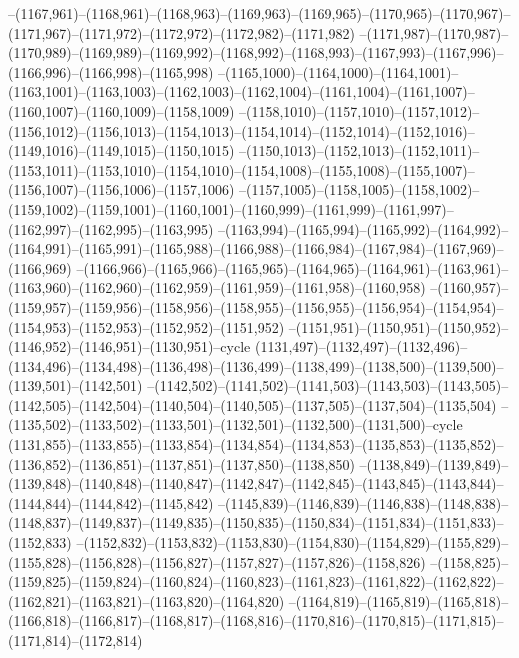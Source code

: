 --(1167,961)--(1168,961)--(1168,963)--(1169,963)--(1169,965)--(1170,965)--(1170,967)--(1171,967)--(1171,972)--(1172,972)--(1172,982)--(1171,982)
--(1171,987)--(1170,987)--(1170,989)--(1169,989)--(1169,992)--(1168,992)--(1168,993)--(1167,993)--(1167,996)--(1166,996)--(1166,998)--(1165,998)
--(1165,1000)--(1164,1000)--(1164,1001)--(1163,1001)--(1163,1003)--(1162,1003)--(1162,1004)--(1161,1004)--(1161,1007)--(1160,1007)--(1160,1009)--(1158,1009)
--(1158,1010)--(1157,1010)--(1157,1012)--(1156,1012)--(1156,1013)--(1154,1013)--(1154,1014)--(1152,1014)--(1152,1016)--(1149,1016)--(1149,1015)--(1150,1015)
--(1150,1013)--(1152,1013)--(1152,1011)--(1153,1011)--(1153,1010)--(1154,1010)--(1154,1008)--(1155,1008)--(1155,1007)--(1156,1007)--(1156,1006)--(1157,1006)
--(1157,1005)--(1158,1005)--(1158,1002)--(1159,1002)--(1159,1001)--(1160,1001)--(1160,999)--(1161,999)--(1161,997)--(1162,997)--(1162,995)--(1163,995)
--(1163,994)--(1165,994)--(1165,992)--(1164,992)--(1164,991)--(1165,991)--(1165,988)--(1166,988)--(1166,984)--(1167,984)--(1167,969)--(1166,969)
--(1166,966)--(1165,966)--(1165,965)--(1164,965)--(1164,961)--(1163,961)--(1163,960)--(1162,960)--(1162,959)--(1161,959)--(1161,958)--(1160,958)
--(1160,957)--(1159,957)--(1159,956)--(1158,956)--(1158,955)--(1156,955)--(1156,954)--(1154,954)--(1154,953)--(1152,953)--(1152,952)--(1151,952)
--(1151,951)--(1150,951)--(1150,952)--(1146,952)--(1146,951)--(1130,951)--cycle
(1131,497)--(1132,497)--(1132,496)--(1134,496)--(1134,498)--(1136,498)--(1136,499)--(1138,499)--(1138,500)--(1139,500)--(1139,501)--(1142,501)
--(1142,502)--(1141,502)--(1141,503)--(1143,503)--(1143,505)--(1142,505)--(1142,504)--(1140,504)--(1140,505)--(1137,505)--(1137,504)--(1135,504)
--(1135,502)--(1133,502)--(1133,501)--(1132,501)--(1132,500)--(1131,500)--cycle
(1131,855)--(1133,855)--(1133,854)--(1134,854)--(1134,853)--(1135,853)--(1135,852)--(1136,852)--(1136,851)--(1137,851)--(1137,850)--(1138,850)
--(1138,849)--(1139,849)--(1139,848)--(1140,848)--(1140,847)--(1142,847)--(1142,845)--(1143,845)--(1143,844)--(1144,844)--(1144,842)--(1145,842)
--(1145,839)--(1146,839)--(1146,838)--(1148,838)--(1148,837)--(1149,837)--(1149,835)--(1150,835)--(1150,834)--(1151,834)--(1151,833)--(1152,833)
--(1152,832)--(1153,832)--(1153,830)--(1154,830)--(1154,829)--(1155,829)--(1155,828)--(1156,828)--(1156,827)--(1157,827)--(1157,826)--(1158,826)
--(1158,825)--(1159,825)--(1159,824)--(1160,824)--(1160,823)--(1161,823)--(1161,822)--(1162,822)--(1162,821)--(1163,821)--(1163,820)--(1164,820)
--(1164,819)--(1165,819)--(1165,818)--(1166,818)--(1166,817)--(1168,817)--(1168,816)--(1170,816)--(1170,815)--(1171,815)--(1171,814)--(1172,814)
